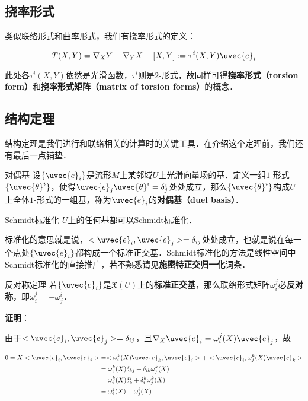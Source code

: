 \subsection{挠率形式}


类似联络形式和曲率形式，我们有挠率形式的定义：

\begin{equation}
T(X, Y)=\nabla_XY-\nabla_YX-[X, Y]:=\tau^i(X, Y)\uvec{e}_i
\end{equation}

此处各$\tau^i(X, Y)$依然是光滑函数，$\tau^i$则是$2$-形式，故同样可得\textbf{挠率形式（torsion form）}和\textbf{挠率形式矩阵（matrix of torsion forms）}的概念．





\subsection{结构定理}

结构定理是我们进行和联络相关的计算时的关键工具．在介绍这个定理前，我们还有最后一点铺垫．


\begin{definition}{对偶基}
设$\{\uvec{e}_i\}$是流形$M$上某邻域$U$上光滑向量场的基．定义一组$1$-形式$\{\uvec{\theta}^i\}$，使得$\uvec{e}_j\uvec{\theta}^i=\delta^i_j$处处成立，那么$\{\uvec{\theta}^i\}$构成$U$上全体$1$-形式的一组基，称为$\uvec{e}_i$的\textbf{对偶基（duel basis）}．
\end{definition}



\begin{theorem}{Schmidt标准化}
$U$上的任何基都可以Schmidt标准化．
\end{theorem}

标准化的意思就是说，$<\uvec{e}_i, \uvec{e}_j>=\delta_{ij}$处处成立，也就是说在每一个点处$\{\uvec{e}_i\}$都构成一个标准正交基．Schmidt标准化的方法是线性空间中Schmidt标准化的直接推广，若不熟悉请见\textbf{施密特正交归一化}词条．

\begin{theorem}{反对称定理}
若$\{\uvec{e}_i\}$是$\mathfrak{X}(U)$上的\textbf{标准正交基}，那么联络形式矩阵$\omega^j_i$必\textbf{反对称}，即$\omega^j_i=-\omega^i_j$．
\end{theorem}

\textbf{证明}：

由于$<\uvec{e}_i, \uvec{e}_j>=\delta_{ij}$，且$\nabla_X\uvec{e}_i=\omega^j_i(X)\uvec{e}_j$，故

\begin{equation}
\begin{aligned}
0=X<\uvec{e}_i, \uvec{e}_j>&=<\omega^k_i(X)\uvec{e}_k, \uvec{e}_j>+<\uvec{e}_i, \omega^k_j(X)\uvec{e}_k>\\
&=\omega^k_i(X)\delta_{kj}+\delta_{ik}\omega^k_j(X)\\
&=\omega^k_i(X)\delta_{k}^j+\delta_{i}^k\omega^k_j(X)\\
&=\omega^j_i(X)+\omega^i_j(X)
\end{aligned}
\end{equation}

